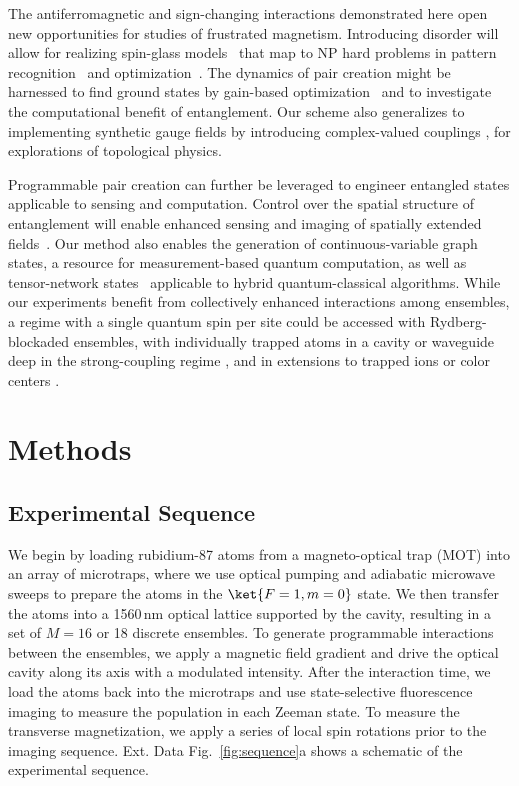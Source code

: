 \documentclass[aps,pra,superscriptaddress,12pt]{revtex4-1} %
\begin{document}
\begin{bibunit}
The antiferromagnetic and sign-changing interactions demonstrated here open new opportunities for studies of frustrated magnetism.  Introducing disorder will allow for realizing spin-glass models~\cite{gopalakrishnan2011frustration,strack2011dicke} that map to NP hard problems in pattern recognition~\cite{Amit1985,marsh2021enhancing} and optimization~\cite{berloff2017realizing}.  The dynamics of pair creation might be harnessed to find ground states by gain-based optimization~\cite{mcmahon2016fully,berloff2017realizing} and to investigate the computational benefit of entanglement.  Our scheme also generalizes to implementing synthetic gauge fields by introducing complex-valued couplings \cite{rudner2020band}, for explorations of topological physics.

Programmable pair creation can further be leveraged to engineer entangled states applicable to sensing \cite{hamley2012spin,masson2017cavity} and computation.  Control over the spatial structure of entanglement will enable enhanced sensing and imaging of spatially extended fields~\cite{Pezze2018}.  Our method also enables the generation of continuous-variable graph states, a resource for measurement-based quantum computation, as well as tensor-network states~\cite{shi2006classical,murg2010simulating} applicable to hybrid quantum-classical algorithms.  While our experiments benefit from collectively enhanced interactions among ensembles, a regime with a single quantum spin per site could be accessed with Rydberg-blockaded ensembles, with individually trapped atoms in a cavity or waveguide deep in the strong-coupling regime \cite{hung2016quantum}, and in extensions to trapped ions \cite{ozeri2020quantum} or color centers \cite{evans2018photon}.

\section*{Methods}

\subsection{Experimental Sequence}
We begin by loading rubidium-87 atoms from a magneto-optical trap (MOT) into an array of microtraps, where we use optical pumping and adiabatic microwave sweeps to prepare the atoms in the $\ket{F = 1, m = 0}$ state. We then transfer the atoms into a 1560\,nm optical lattice supported by the cavity, resulting in a set of $M = 16$ or 18 discrete ensembles.
To generate programmable interactions between the ensembles, we apply a magnetic field gradient and drive the optical cavity along its axis with a modulated intensity. 
After the interaction time, we load the atoms back into the microtraps and use state-selective fluorescence imaging to measure the population in each Zeeman state.  To measure the transverse magnetization, we apply a series of local spin rotations prior to the imaging sequence.  Ext. Data Fig.~\ref{fig:sequence}a shows a schematic of the experimental sequence.



\end{bibunit}
\end{document}

